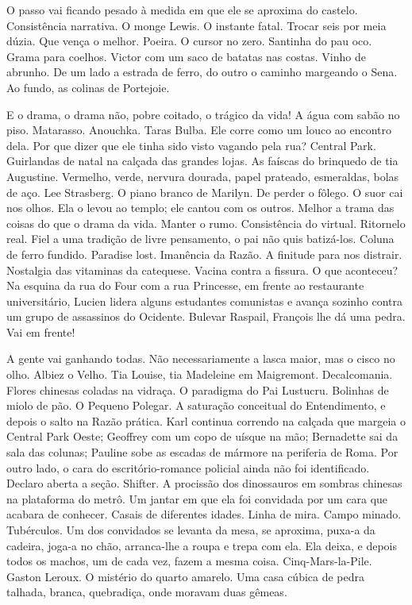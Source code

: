 O passo vai ficando pesado à medida em que ele se aproxima do castelo.
Consistência narrativa. O monge Lewis. O instante fatal. Trocar seis por
meia dúzia. Que vença o melhor. Poeira. O cursor no zero. Santinha do
pau oco. Grama para coelhos. Victor com um saco de batatas nas costas.
Vinho de abrunho. De um lado a estrada de ferro, do outro o caminho
margeando o Sena. Ao fundo, as colinas de Portejoie.

E o drama, o drama não, pobre coitado, o trágico da vida! A água com
sabão no piso. Matarasso. Anouchka. Taras Bulba. Ele corre como um louco
ao encontro dela. Por que dizer que ele tinha sido visto vagando pela
rua? Central Park. Guirlandas de natal na calçada das grandes lojas. As
faíscas do brinquedo de tia Augustine. Vermelho, verde, nervura dourada,
papel prateado, esmeraldas, bolas de aço. Lee Strasberg. O piano branco
de Marilyn. De perder o fôlego. O suor cai nos olhos. Ela o levou ao
templo; ele cantou com os outros. Melhor a trama das coisas do que o
drama da vida. Manter o rumo. Consistência do virtual. Ritornelo real.
Fiel a uma tradição de livre pensamento, o pai não quis batizá-los.
Coluna de ferro fundido. Paradise lost. Imanência da Razão. A finitude
para nos distrair. Nostalgia das vitaminas da catequese. Vacina contra a
fissura. O que aconteceu? Na esquina da rua do Four com a rua Princesse,
em frente ao restaurante universitário, Lucien lidera alguns estudantes
comunistas e avança sozinho contra um grupo de assassinos do Ocidente.
Bulevar Raspail, François lhe dá uma pedra. Vai em frente!

A gente vai ganhando todas. Não necessariamente a lasca maior, mas o
cisco no olho. Albiez o Velho. Tia Louise, tia Madeleine em Maigremont.
Decalcomania. Flores chinesas coladas na vidraça. O paradigma do Pai
Lustucru. Bolinhas de miolo de pão. O Pequeno Polegar. A saturação
conceitual do Entendimento, e depois o salto na Razão prática. Karl
continua correndo na calçada que margeia o Central Park Oeste; Geoffrey
com um copo de uísque na mão; Bernadette sai da sala das colunas;
Pauline sobe as escadas de mármore na periferia de Roma. Por outro lado,
o cara do escritório-romance policial ainda não foi identificado.
Declaro aberta a seção. Shifter. A procissão dos dinossauros em sombras
chinesas na plataforma do metrô. Um jantar em que ela foi convidada por
um cara que acabara de conhecer. Casais de diferentes idades. Linha de
mira. Campo minado. Tubérculos. Um dos convidados se levanta da mesa, se
aproxima, puxa-a da cadeira, joga-a no chão, arranca-lhe a roupa e trepa
com ela. Ela deixa, e depois todos os machos, um de cada vez, fazem a
mesma coisa. Cinq-Mars-la-Pile. Gaston Leroux. O mistério do quarto
amarelo. Uma casa cúbica de pedra talhada, branca, quebradiça, onde
moravam duas gêmeas.

